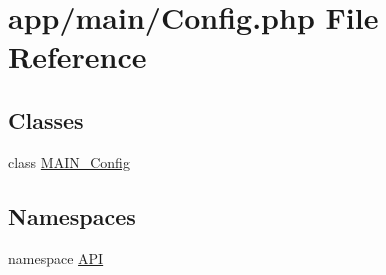 \hypertarget{Config_8php}{
\section{app/main/Config.php File Reference}
\label{d7/d8c/Config_8php}
}
\subsection*{Classes}
\begin{DoxyCompactItemize}
\item 
class \hyperlink{classMAIN__Config}{MAIN\_\-Config}
\end{DoxyCompactItemize}
\subsection*{Namespaces}
\begin{DoxyCompactItemize}
\item 
namespace \hyperlink{namespaceAPI}{API}
\end{DoxyCompactItemize}
